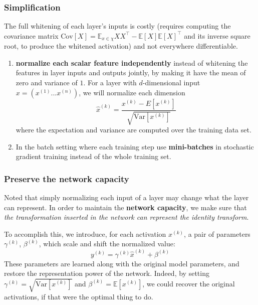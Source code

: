 \documentclass[a3paper, 12pt]{book} %
\begin{document}
\subsubsection{Simplification}  
The full whitening of each layer's inputs is costly (requires computing the covariance matrix $\mathrm{Cov}[X]=\mathbb{E}_{x\in \chi}{XX^\top}-\mathbb{E}{[X]}\mathbb{E}{[X]}^\top$ and its inverse square root, to produce the whitened activation) and not everywhere differentiable.
\begin{enumerate}
	\item \textbf{normalize each scalar feature independently} instead of whitening the features in layer inputs and outputs jointly, by making it have the mean of zero and variance of $1$. For a layer with $d$-dimensional input $x=(x^{(1)}...x^{(n)})$, we will normalize each dimension 
	$$\hat{x}^{(k)}=\frac{x^{(k)}-E{[x^{(k)}]}}{\sqrt{\mathrm{Var}{[x^{(k)}]}}}$$ where the expectation and variance are computed over the training data set.
	
	
	\item In the batch setting where each training step use \textbf{mini-batches} in stochastic gradient training instead of the whole training set.
\end{enumerate}

\subsubsection{Preserve the network capacity}
Noted that simply normalizing each input of a layer may change what the layer can represent. In order to maintain the \textbf{network capacity}, we make sure that \emph{the transformation inserted in the network can represent the identity transform}.

To accomplish this, we introduce, for each activation $x^{(k)}$, a pair of parameters $\gamma^{(k)}$, $\beta^{(k)}$, which scale and shift the normalized value:
$$y^{(k)}=\gamma^{(k)}\hat{x}^{(k)}+\beta^{(k)}$$
These parameters are learned along with the original
model parameters, and restore the representation power
of the network. Indeed, by setting $\gamma^{(k)} = \sqrt{\mathrm{Var}{[x^{(k)}]}}$ and
$\beta^{(k)} = \mathbb{E}[x^{(k)}]$, we could recover the original activations,
if that were the optimal thing to do.
\end{document}
